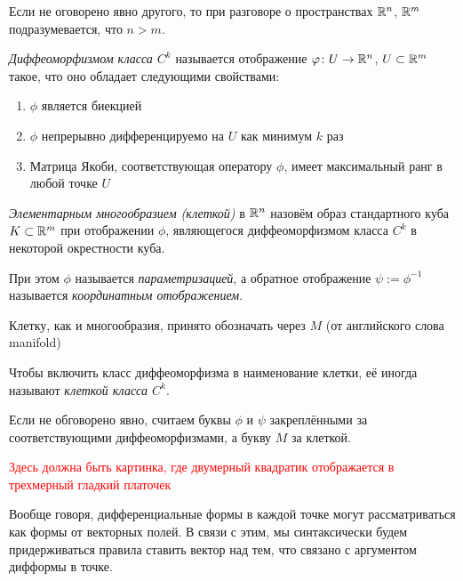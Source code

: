 \begin{note}
	Если не оговорено явно другого, то при разговоре о пространствах $\mathbb{R}^n$, $\mathbb{R}^m$ подразумевается, что $n > m$.
\end{note}

\begin{definition}
	\textit{Диффеоморфизмом класса $C^k$} называется отображение $\varphi \colon U \to \mathbb{R}^n$, $U \subset \mathbb{R}^m$ такое, что оно обладает следующими свойствами:
	\begin{enumerate}
		\item $\phi$ является биекцией
		
		\item $\phi$ непрерывно дифференцируемо на $U$ как минимум $k$ раз
		
		\item Матрица Якоби, соответствующая оператору $\phi$, имеет максимальный ранг в любой точке $U$
	\end{enumerate}
\end{definition}

\begin{definition}
	\textit{Элементарным многообразием (клеткой)} в $\mathbb{R}^n$ назовём образ стандартного куба $K \subset \mathbb{R}^m$ при отображении $\phi$, являющегося диффеоморфизмом класса $C^k$ в некоторой окрестности куба.
	
	При этом $\phi$ называется \textit{параметризацией}, а обратное отображение $\psi := \phi^{-1}$ называется \textit{координатным отображением}.
\end{definition}

\begin{note}
	Клетку, как и многообразия, принято обозначать через $M$ (от английского слова manifold)
\end{note}

\begin{note}
	Чтобы включить класс диффеоморфизма в наименование клетки, её иногда называют \textit{клеткой класса $C^k$}.
\end{note}

\begin{note}
	Если не обговорено явно, считаем буквы $\phi$ и $\psi$ закреплёнными за соответствующими диффеоморфизмами, а букву $M$ за клеткой.
\end{note}

\textcolor{red}{Здесь должна быть картинка, где двумерный квадратик отображается в трехмерный гладкий платочек}

\begin{note}
	Вообще говоря, дифференциальные формы в каждой точке могут рассматриваться как формы от векторных полей. В связи с этим, мы синтаксически будем придерживаться правила ставить вектор над тем, что связано с аргументом дифформы в точке.
\end{note}

